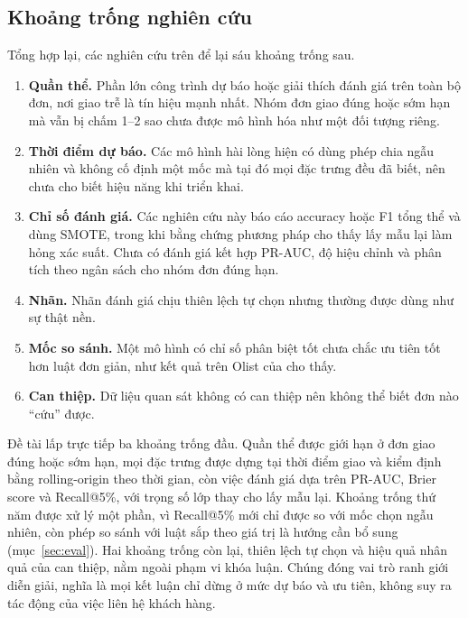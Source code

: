 \subsection{Khoảng trống nghiên cứu}\label{sec:rel-gaps}

Tổng hợp lại, các nghiên cứu trên để lại sáu khoảng trống sau.
\begin{enumerate}
  \item \textbf{Quần thể.} Phần lớn công trình dự báo hoặc giải thích đánh giá trên toàn bộ đơn, nơi giao trễ là tín hiệu mạnh nhất. Nhóm đơn giao đúng hoặc sớm hạn mà vẫn bị chấm 1--2 sao chưa được mô hình hóa như một đối tượng riêng.
  \item \textbf{Thời điểm dự báo.} Các mô hình hài lòng hiện có dùng phép chia ngẫu nhiên và không cố định một mốc mà tại đó mọi đặc trưng đều đã biết, nên chưa cho biết hiệu năng khi triển khai.
  \item \textbf{Chỉ số đánh giá.} Các nghiên cứu này báo cáo accuracy hoặc F1 tổng thể và dùng SMOTE, trong khi bằng chứng phương pháp cho thấy lấy mẫu lại làm hỏng xác suất. Chưa có đánh giá kết hợp PR-AUC, độ hiệu chỉnh và phân tích theo ngân sách cho nhóm đơn đúng hạn.
  \item \textbf{Nhãn.} Nhãn đánh giá chịu thiên lệch tự chọn nhưng thường được dùng như sự thật nền.
  \item \textbf{Mốc so sánh.} Một mô hình có chỉ số phân biệt tốt chưa chắc ưu tiên tốt hơn luật đơn giản, như kết quả trên Olist của \textcite{li2026valuesorting} cho thấy.
  \item \textbf{Can thiệp.} Dữ liệu quan sát không có can thiệp nên không thể biết đơn nào ``cứu'' được.
\end{enumerate}

Đề tài lấp trực tiếp ba khoảng trống đầu. Quần thể được giới hạn ở đơn giao đúng hoặc sớm hạn, mọi đặc trưng được dựng tại thời điểm giao và kiểm định bằng rolling-origin theo thời gian, còn việc đánh giá dựa trên PR-AUC, Brier score và Recall@5\%, với trọng số lớp thay cho lấy mẫu lại. Khoảng trống thứ năm được xử lý một phần, vì Recall@5\% mới chỉ được so với mốc chọn ngẫu nhiên, còn phép so sánh với luật sắp theo giá trị là hướng cần bổ sung (mục~\ref{sec:eval}). Hai khoảng trống còn lại, thiên lệch tự chọn và hiệu quả nhân quả của can thiệp, nằm ngoài phạm vi khóa luận. Chúng đóng vai trò ranh giới diễn giải, nghĩa là mọi kết luận chỉ dừng ở mức dự báo và ưu tiên, không suy ra tác động của việc liên hệ khách hàng.

